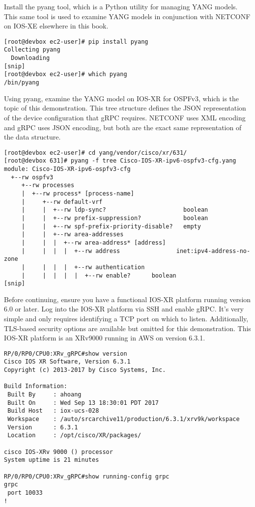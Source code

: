 Install the pyang tool, which is a Python utility for managing YANG models.
This same tool is used to examine YANG models in conjunction with NETCONF on
IOS-XE elsewhere in this book.

\begin{verbatim}
[root@devbox ec2-user]# pip install pyang
Collecting pyang
  Downloading
[snip]
[root@devbox ec2-user]# which pyang
/bin/pyang
\end{verbatim}

Using pyang, examine the YANG model on IOS-XR for OSPFv3, which is the topic
of this demonstration. This tree structure defines the JSON representation of
the device configuration that gRPC requires. NETCONF uses XML encoding and
gRPC uses JSON encoding, but both are the exact same representation of the
data structure.

\begin{verbatim}
[root@devbox ec2-user]# cd yang/vendor/cisco/xr/631/
[root@devbox 631]# pyang -f tree Cisco-IOS-XR-ipv6-ospfv3-cfg.yang
module: Cisco-IOS-XR-ipv6-ospfv3-cfg
  +--rw ospfv3
     +--rw processes
     |  +--rw process* [process-name]
     |     +--rw default-vrf
     |     |  +--rw ldp-sync?                      boolean
     |     |  +--rw prefix-suppression?            boolean
     |     |  +--rw spf-prefix-priority-disable?   empty
     |     |  +--rw area-addresses
     |     |  |  +--rw area-address* [address]
     |     |  |  |  +--rw address                inet:ipv4-address-no-zone
     |     |  |  |  +--rw authentication
     |     |  |  |  |  +--rw enable?      boolean
[snip]
\end{verbatim}

Before continuing, ensure you have a functional IOS-XR platform running
version 6.0 or later. Log into the IOS-XR platform via SSH and enable gRPC.
It's very simple and only requires identifying a TCP port on which to listen.
Additionally, TLS-based security options are available but omitted for this
demonstration. This IOS-XR platform is an XRv9000 running in AWS on version 6.3.1.

\begin{verbatim}
RP/0/RP0/CPU0:XRv_gRPC#show version                  
Cisco IOS XR Software, Version 6.3.1
Copyright (c) 2013-2017 by Cisco Systems, Inc.

Build Information:
 Built By     : ahoang
 Built On     : Wed Sep 13 18:30:01 PDT 2017
 Build Host   : iox-ucs-028
 Workspace    : /auto/srcarchive11/production/6.3.1/xrv9k/workspace
 Version      : 6.3.1
 Location     : /opt/cisco/XR/packages/

cisco IOS-XRv 9000 () processor 
System uptime is 21 minutes

RP/0/RP0/CPU0:XRv_gRPC#show running-config grpc 
grpc
 port 10033
!
\end{verbatim}

